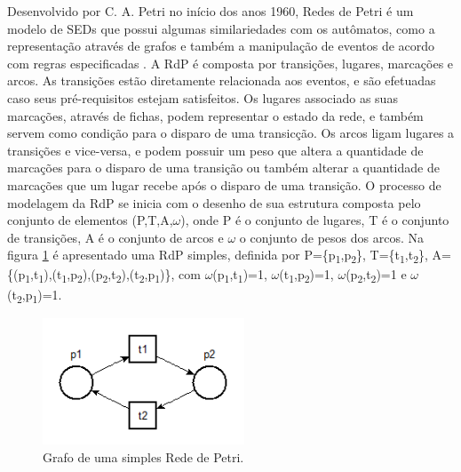 Desenvolvido por C. A. Petri no in\'icio dos anos 1960, Redes de Petri \'e um modelo de SEDs que possui algumas similariedades com os aut\^omatos, como a representa\c{c}\~ao atrav\'es de grafos e tamb\'em a manipula\c{c}\~ao de eventos de acordo com regras especificadas \cite{Cassandras2008}. A RdP \'e composta por transi\c{c}\~oes, lugares, marca\c{c}\~oes e arcos. As transi\c{c}\~oes est\~ao diretamente relacionada aos eventos, e s\~ao efetuadas caso seus pr\'e-requisitos estejam satisfeitos. Os lugares associado as suas marca\c{c}\~oes, atrav\'es de fichas, podem representar o estado da rede, e tamb\'em servem como condi\c{c}\~ao para o disparo de uma transic\c{c}\~ao. Os arcos ligam lugares a transi\c{c}\~oes e vice-versa, e podem possuir um peso que altera a quantidade de marca\c{c}\~oes para o disparo de uma transi\c{c}\~ao ou tamb\'em alterar a quantidade de marca\c{c}\~oes que um lugar recebe ap\'os o disparo de uma transi\c{c}\~ao.
O processo de modelagem da RdP se inicia com o desenho de sua estrutura composta pelo conjunto de elementos (P,T,A,$\omega$), onde P \'e o conjunto de lugares, T \'e o conjunto de transi\c{c}\~oes, A \'e o conjunto de arcos e $\omega$ o conjunto de pesos dos arcos. Na figura \ref{fig:rdpsimples} \'e apresentado uma RdP simples, definida por P=\{p\textsubscript{1},p\textsubscript{2}\}, T=\{t\textsubscript{1},t\textsubscript{2}\}, A=\{(p\textsubscript{1},t\textsubscript{1}),(t\textsubscript{1},p\textsubscript{2}),(p\textsubscript{2},t\textsubscript{2}),(t\textsubscript{2},p\textsubscript{1})\}, com  $\omega$(p\textsubscript{1},t\textsubscript{1})=1, $\omega$(t\textsubscript{1},p\textsubscript{2})=1, $\omega$(p\textsubscript{2},t\textsubscript{2})=1 e $\omega$(t\textsubscript{2},p\textsubscript{1})=1.

\begin{figure}[!htb]
	\caption[Grafo de uma simples Rede de Petri]{Grafo de uma simples Rede de Petri.}
	\label{fig:rdpsimples}
	\includegraphics[width=6cm]{./figuras/RDP_SIMPLES.png}\centering
\end{figure}



